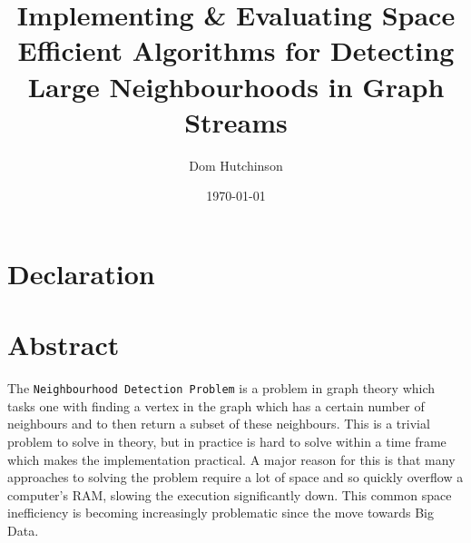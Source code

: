 \documentclass[11pt,twoside,a4paper]{report}
\begin{document}
\renewcommand{\headrulewidth}{0pt}
\newcommand{\ie}{\textit{i.e.} }
\newcommand{\nats}{\mathbb{N} }
\newcommand{\horizontalline}{\newline\vspace{.3cm}\hfill\makebox[.5\linewidth]{\rule{.5\textwidth}{0.4pt}}\hfill\vspace{.05cm}}

\newcommand{\smallsim}{\smallsym{\mathrel}{\sim}}

\makeatletter
\newcommand{\smallsym}[2]{#1{\mathpalette\make@small@sym{#2}}}
\newcommand{\make@small@sym}[2]{%
  \vcenter{\hbox{$\m@th\downgrade@style#1#2$}}%
}
\newcommand{\downgrade@style}[1]{%
  \ifx#1\displaystyle\scriptstyle\else
    \ifx#1\textstyle\scriptstyle\else
      \scriptscriptstyle
  \fi\fi
}
\makeatother

\renewcommand\thetable{\arabic{table}} %
\renewcommand{\thefigure}{\arabic{chapter}.\arabic{section}.\arabic{figure}}


\pagestyle{fancy}
\fancyhead[C]{}
\fancyhead[R]{\today}

\DontPrintSemicolon

\title{Implementing \& Evaluating Space Efficient Algorithms for Detecting Large Neighbourhoods in Graph Streams}
\author{Dom Hutchinson}
\date{\today}
\maketitle
\newpage

\chapter*{Declaration}

\tableofcontents
\newpage

\chapter*{Abstract}

\par The \texttt{Neighbourhood Detection Problem} is a problem in graph theory which tasks one with finding a vertex in the graph which has a certain number of neighbours and to then return a subset of these neighbours. This is a trivial problem to solve in theory, but in practice is hard to solve within a time frame which makes the implementation practical. A major reason for this is that many approaches to solving the problem require a lot of space and so quickly overflow a computer's RAM, slowing the execution significantly down. This common space inefficiency is becoming increasingly problematic since the move towards Big Data.
\end{document}
